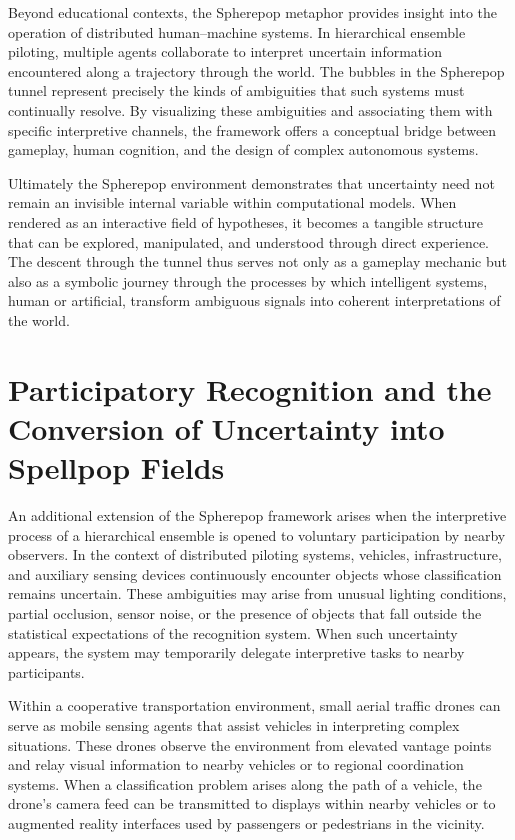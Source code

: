 \documentclass[11pt]{article}
\begin{document}
Beyond educational contexts, the Spherepop metaphor provides insight into the operation of distributed human--machine systems. In hierarchical ensemble piloting, multiple agents collaborate to interpret uncertain information encountered along a trajectory through the world. The bubbles in the Spherepop tunnel represent precisely the kinds of ambiguities that such systems must continually resolve. By visualizing these ambiguities and associating them with specific interpretive channels, the framework offers a conceptual bridge between gameplay, human cognition, and the design of complex autonomous systems.

Ultimately the Spherepop environment demonstrates that uncertainty need not remain an invisible internal variable within computational models. When rendered as an interactive field of hypotheses, it becomes a tangible structure that can be explored, manipulated, and understood through direct experience. The descent through the tunnel thus serves not only as a gameplay mechanic but also as a symbolic journey through the processes by which intelligent systems, human or artificial, transform ambiguous signals into coherent interpretations of the world.

\section{Participatory Recognition and the Conversion of Uncertainty into Spellpop Fields}

An additional extension of the Spherepop framework arises when the interpretive process of a hierarchical ensemble is opened to voluntary participation by nearby observers. In the context of distributed piloting systems, vehicles, infrastructure, and auxiliary sensing devices continuously encounter objects whose classification remains uncertain. These ambiguities may arise from unusual lighting conditions, partial occlusion, sensor noise, or the presence of objects that fall outside the statistical expectations of the recognition system. When such uncertainty appears, the system may temporarily delegate interpretive tasks to nearby participants.

Within a cooperative transportation environment, small aerial traffic drones can serve as mobile sensing agents that assist vehicles in interpreting complex situations. These drones observe the environment from elevated vantage points and relay visual information to nearby vehicles or to regional coordination systems. When a classification problem arises along the path of a vehicle, the drone's camera feed can be transmitted to displays within nearby vehicles or to augmented reality interfaces used by passengers or pedestrians in the vicinity.
\end{document}
